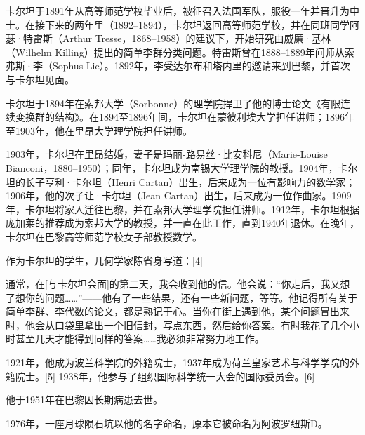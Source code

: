 卡尔坦于1891年从高等师范学校毕业后，被征召入法国军队，服役一年并晋升为中士。在接下来的两年里（1892–1894），卡尔坦返回高等师范学校，并在同班同学阿瑟·特雷斯（Arthur Tresse，1868–1958）的建议下，开始研究由威廉·基林（Wilhelm Killing）提出的简单李群分类问题。特雷斯曾在1888–1889年间师从索弗斯·李（Sophus Lie）。1892年，李受达尔布和塔内里的邀请来到巴黎，并首次与卡尔坦见面。

卡尔坦于1894年在索邦大学（Sorbonne）的理学院捍卫了他的博士论文《有限连续变换群的结构》。在1894至1896年间，卡尔坦在蒙彼利埃大学担任讲师；1896年至1903年，他在里昂大学理学院担任讲师。

1903年，卡尔坦在里昂结婚，妻子是玛丽-路易丝·比安科尼（Marie-Louise Bianconi，1880–1950）；同年，卡尔坦成为南锡大学理学院的教授。1904年，卡尔坦的长子亨利·卡尔坦（Henri Cartan）出生，后来成为一位有影响力的数学家；1906年，他的次子让·卡尔坦（Jean Cartan）出生，后来成为一位作曲家。1909年，卡尔坦将家人迁往巴黎，并在索邦大学理学院担任讲师。1912年，卡尔坦根据庞加莱的推荐成为索邦大学的教授，并一直在此工作，直到1940年退休。在晚年，卡尔坦在巴黎高等师范学校女子部教授数学。

作为卡尔坦的学生，几何学家陈省身写道：[4]

通常，在[与卡尔坦会面]的第二天，我会收到他的信。他会说：“你走后，我又想了想你的问题……”——他有了一些结果，还有一些新问题，等等。他记得所有关于简单李群、李代数的论文，都是熟记于心。当你在街上遇到他，某个问题冒出来时，他会从口袋里拿出一个旧信封，写点东西，然后给你答案。有时我花了几个小时甚至几天才能得到同样的答案……我必须非常努力地工作。

1921年，他成为波兰科学院的外籍院士，1937年成为荷兰皇家艺术与科学学院的外籍院士。[5] 1938年，他参与了组织国际科学统一大会的国际委员会。[6]

他于1951年在巴黎因长期病患去世。

1976年，一座月球陨石坑以他的名字命名，原本它被命名为阿波罗纽斯D。